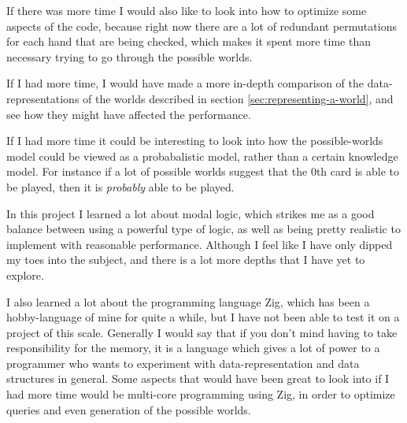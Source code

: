 If there was more time I would also like to look into how to optimize some aspects of the code, because right now there are a lot of redundant permutations for each hand that are being checked, which makes it spent more time than necessary trying to go through the possible worlds.

If I had more time, I would have made a more in-depth comparison of the data-representations of the worlds described in section \ref{sec:representing-a-world}, and see how they might have affected the performance.

If I had more time it could be interesting to look into how the possible-worlds model could be viewed as a probabalistic model, rather than a certain knowledge model. For instance if a lot of possible worlds suggest that the 0th card is able to be played, then it is \emph{probably} able to be played.



In this project I learned a lot about modal logic, which strikes me as a good balance between using a powerful type of logic, as well as being pretty realistic to implement with reasonable performance.
Although I feel like I have only dipped my toes into the subject, and there is a lot more depths that I have yet to explore.

I also learned a lot about the programming language Zig, which has been a hobby-language of mine for quite a while, but I have not been able to test it on a project of this scale.
Generally I would say that if you don't mind having to take responsibility for the memory, it is a language which gives a lot of power to a programmer who wants to experiment with data-representation and data structures in general.
Some aspects that would have been great to look into if I had more time would be multi-core programming using Zig, in order to optimize queries and even generation of the possible worlds.


